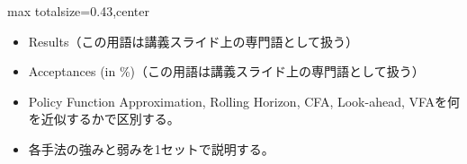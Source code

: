 \clearpage
{}
\begin{minipage}[t]{0.405\textwidth}
\begin{adjustbox}{max totalsize={\textwidth}{0.43\textheight},center}
\begin{minipage}{\textwidth}\scriptsize
{}\begin{itemize}
\item Results（この用語は講義スライド上の専門語として扱う）
\item Acceptances (in \%)（この用語は講義スライド上の専門語として扱う）
\end{itemize}\begin{itemize}
\item Policy Function Approximation, Rolling Horizon, CFA, Look-ahead, VFAを何を近似するかで区別する。
\item 各手法の強みと弱みを1セットで説明する。
\end{itemize}
\end{minipage}
\end{adjustbox}
\end{minipage}\hfill
